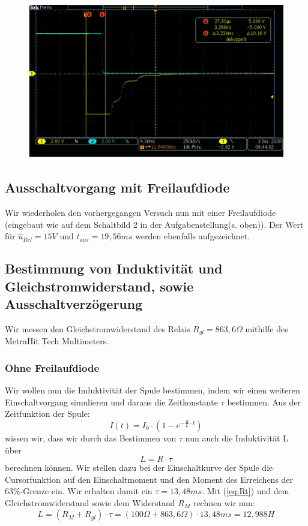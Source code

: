 \documentclass{article}
\begin{document}
\begin{figure}
    \begin{center}
        \includegraphics[scale=0.45]{../assets/images/ET2P4/aufgabe2c.JPG}
    \end{center}
\end{figure}

\subsection{Ausschaltvorgang mit Freilaufdiode}

Wir wiederholen den vorhergegangen Versuch nun mit einer Freilaufdiode (eingebaut wie auf dem Schaltbild 2 in der Aufgabenstellung(s. oben)). Der Wert für $\hat{u}_{Rel} = 15V$ und $t_{aus} = 19,56ms$ werden 
ebenfalls aufgezeichnet.

\subsection{Bestimmung von Induktivität und Gleichstromwiderstand, sowie Ausschaltverzögerung}

Wir messen den Gleichstromwiderstand des Relais $R_{gl} = 863,6\Omega$ mithilfe des MetraHit Tech Multimeters.
\subsubsection{Ohne Freilaufdiode}

Wir wollen nun die Induktivität der Spule bestimmen, indem wir einen weiteren Einschaltvorgang simulieren und daraus die Zeitkonstante $\tau$ bestimmen. 
Aus der Zeitfunktion der Spule:
\begin{equation}
    I(t) = I_0 \cdot \left(1-e^{-\frac{R}{L}\cdot t}\right) 
\end{equation}
wissen wir, dass wir durch das Bestimmen von $\tau$ nun auch die Induktivität L über 
\begin{equation}\label{eq:Rt}
    L = R\cdot\tau
\end{equation}
berechnen können. Wir stellen dazu bei der Einschaltkurve der Spule die Cursorfunktion auf den Einschaltmoment und den Moment des Erreichens der 63\%-Grenze ein.
Wir erhalten damit ein $\tau = 13,48ms$. Mit (\ref{eq:Rt}) und dem Gleichstromwiderstand sowie dem Widerstand $R_M$ rechnen wir nun:
\begin{equation*}
    L = (R_M + R_{gl})\cdot \tau = (100\Omega + 863,6\Omega)\cdot 13,48ms = 12,988H
\end{equation*}
\end{document}
